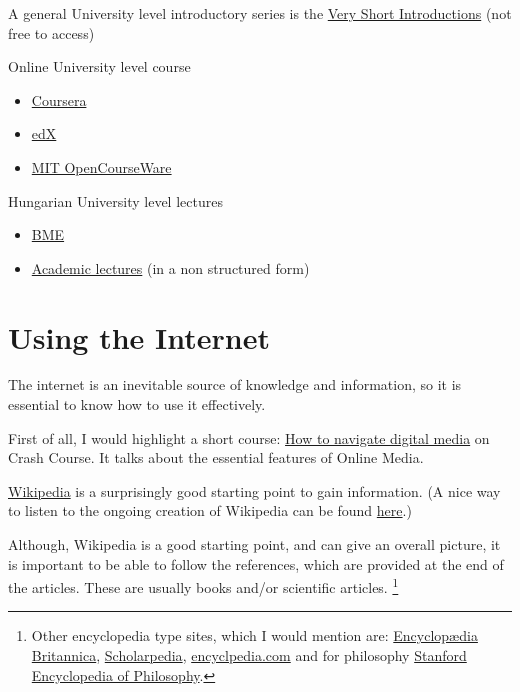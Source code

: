 \documentclass{article}
\begin{document}
A general University level introductory series is the \href{https://www.veryshortintroductions.com/browse}{Very Short Introductions} (not free to access)

Online University level course
\begin{itemize}
    \item \href{https://www.coursera.org/}{Coursera}
    \item \href{https://www.edx.org/}{edX}
    \item \href{https://ocw.mit.edu/index.htm}{MIT OpenCourseWare}
\end{itemize}

Hungarian University level lectures
\begin{itemize}
    \item \href{https://bme.videotorium.hu/}{BME}
    \item \href{http://videotorium.hu/}{Academic lectures} (in a non structured form)
\end{itemize}


\section{Using the Internet}

The internet is an inevitable source of knowledge and information, so it is essential to know how to use it effectively.

First of all, I would highlight a short course: \href{https://www.youtube.com/playlist?list=PL8dPuuaLjXtN07XYqqWSKpPrtNDiCHTzU}{How to navigate digital media} on Crash Course. It talks about the essential features of Online Media.


\href{https://www.wikipedia.org/}{Wikipedia} is a surprisingly good starting point to gain information. (A nice way to listen to the ongoing creation of Wikipedia can be found \href{http://listen.hatnote.com/#nowelcomes,en}{here}.)

Although, Wikipedia is a good starting point, and can give an overall picture, it is important to be able to follow the references, which are provided at the end of the articles.
These are usually books and/or scientific articles. \footnote{Other encyclopedia type sites, which I would mention are: \href{https://www.britannica.com/}{Encyclopædia Britannica}, \href{http://www.scholarpedia.org/article/Main_Page}{Scholarpedia}, \href{https://www.encyclopedia.com/}{encyclpedia.com} and for philosophy \href{https://plato.stanford.edu/index.html}{Stanford Encyclopedia of Philosophy}.}
\end{document}
